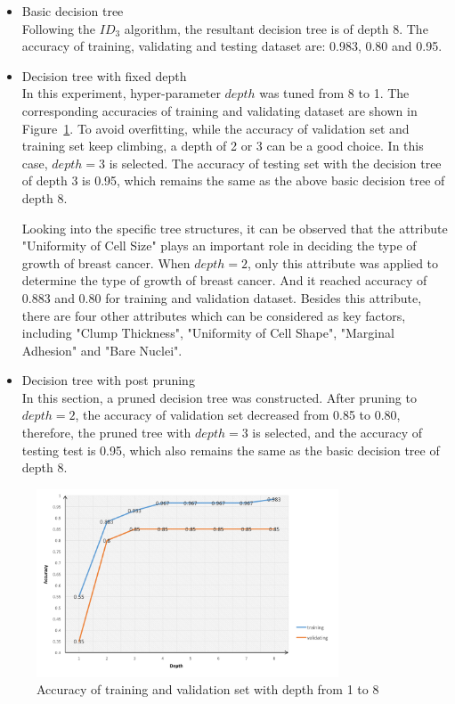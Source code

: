 \documentclass[11pt]{article}
\begin{document}
\begin{itemize}
\item[(1)] Basic decision tree\\
Following the \(ID_3\) algorithm, the resultant decision tree is of depth 8. The accuracy of training, validating and testing dataset are: 0.983, 0.80 and 0.95. 
\item[(2)] Decision tree with fixed depth\\
In this experiment, hyper-parameter \(depth\) was tuned from 8 to 1. The corresponding accuracies of training and validating dataset are shown in Figure~\ref{fig:depth}. To avoid overfitting, while the accuracy of validation set and training set keep climbing, a depth of 2 or 3 can be a good choice. In this case, \(depth=3\) is selected. The accuracy of testing set with the decision tree of depth 3 is 0.95, which remains the same as the above basic decision tree of depth 8. 

Looking into the specific tree structures, it can be observed that the attribute "Uniformity of Cell Size" plays an important role in deciding the type of growth of breast cancer. When \(depth=2\), only this attribute was applied to determine the type of growth of breast cancer. And it reached accuracy of 0.883 and 0.80 for training and validation dataset. Besides this attribute, there are four other attributes which can be considered as key factors, including "Clump Thickness", "Uniformity of Cell Shape", "Marginal Adhesion" and "Bare Nuclei". 
\item[(3)] Decision tree with post pruning\\
In this section, a pruned decision tree was constructed. After pruning to \(depth=2\), the accuracy of validation set decreased from 0.85 to 0.80, therefore, the pruned tree with \(depth=3\) is selected, and the accuracy of testing test is 0.95, which also remains the same as the basic decision tree of depth 8.
\end{itemize}

\begin{figure}[h]
    \centering
    \includegraphics[width=0.8\textwidth]{depth.png}
    \caption{Accuracy of training and validation set with depth from 1 to 8}
    \label{fig:depth}
\end{figure}
\end{document}

